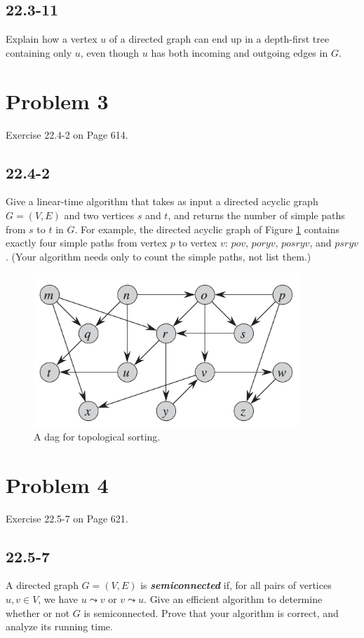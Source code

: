 \documentclass{../../class}
\begin{document}
\subsection*{22.3-11}
Explain how a vertex $u$ of a directed graph can end up in a depth-first tree containing only $u$, even though $u$ has both incoming and outgoing edges in $G$.

\newpage
\section*{Problem 3}
\begin{tcolorbox}
    Exercise 22.4-2 on Page 614.
\end{tcolorbox}
\subsection*{22.4-2}
Give a linear-time algorithm that takes as input a directed acyclic graph $G = (V, E)$ and two vertices $s$ and $t$, and returns the number of simple paths from $s$ to $t$ in $G$. For example, the directed acyclic graph of Figure \ref{fig:dag} contains exactly four simple paths from vertex $p$ to vertex $v$: $pov$, $poryv$, $posryv$, and $psryv$. (Your algorithm needs only to count the simple paths, not list them.)
\begin{figure}[H]
    \centering
    \includegraphics[width = 10cm]{img/dag.png}
    \caption{A dag for topological sorting.}
    \label{fig:dag}
\end{figure}

\newpage
\section*{Problem 4}
\begin{tcolorbox}
    Exercise 22.5-7 on Page 621.
\end{tcolorbox}
\subsection*{22.5-7}
A directed graph $G = (V, E)$ is \textbf{\textit{semiconnected}} if, for all pairs of vertices $u, v\in V$, we have $u \leadsto v$ or $v \leadsto u$. Give an efficient algorithm to determine whether or not $G$ is semiconnected. Prove that your algorithm is correct, and analyze its running time.
\end{document}
